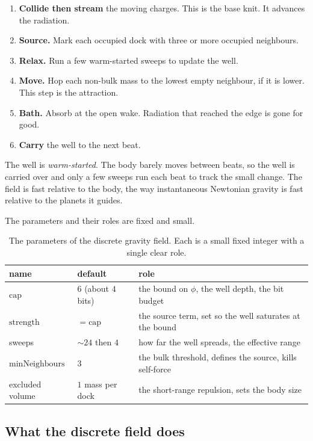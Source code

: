 \begin{enumerate}
\item \textbf{Collide then stream} the moving charges. This is the base knit. It advances the radiation.
\item \textbf{Source.} Mark each occupied dock with three or more occupied neighbours.
\item \textbf{Relax.} Run a few warm-started sweeps to update the well.
\item \textbf{Move.} Hop each non-bulk mass to the lowest empty neighbour, if it is lower. This step is the attraction.
\item \textbf{Bath.} Absorb at the open wake. Radiation that reached the edge is gone for good.
\item \textbf{Carry} the well to the next beat.
\end{enumerate}

The well is \emph{warm-started}. The body barely moves between beats, so the well is carried over and only a few sweeps run each beat to track the small change. The field is fast relative to the body, the way instantaneous Newtonian gravity is fast relative to the planets it guides.

The parameters and their roles are fixed and small.

\begin{table}[ht]
\centering
\begin{tabular}{@{}lll@{}}
\toprule
name & default & role \\
\midrule
$\mathrm{cap}$ & $6$ (about $4$ bits) & the bound on $\phi$, the well depth, the bit budget \\
$\mathrm{strength}$ & $=\mathrm{cap}$ & the source term, set so the well saturates at the bound \\
sweeps & $\sim 24$ then $4$ & how far the well spreads, the effective range \\
$\mathrm{minNeighbours}$ & $3$ & the bulk threshold, defines the source, kills self-force \\
excluded volume & $1$ mass per dock & the short-range repulsion, sets the body size \\
\bottomrule
\end{tabular}
\caption{The parameters of the discrete gravity field. Each is a small fixed integer with a single clear role.}
\label{tab:gravity-params}
\end{table}

\subsection{What the discrete field does}


